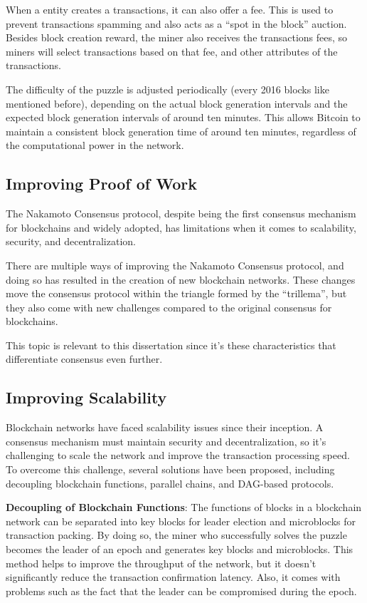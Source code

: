When a entity creates a transactions, it can also offer a fee. This is used to prevent transactions spamming and also acts as a ``spot in the block'' auction.
Besides block creation reward, the miner also receives the transactions fees, so miners will select transactions based on that fee, and other attributes of the transactions.

The difficulty of the puzzle is adjusted periodically (every 2016 blocks like mentioned before), depending on the actual block generation intervals and the expected block generation intervals of around ten minutes. This allows Bitcoin to maintain a consistent block generation time of around ten minutes, regardless of the computational power in the network.

\subsection*{Improving Proof of Work}

The Nakamoto Consensus protocol, despite being the first consensus mechanism for blockchains and widely adopted, has limitations when it comes to scalability, security, and decentralization.

There are multiple ways of improving the Nakamoto Consensus protocol, and doing so has resulted in the creation of new blockchain networks. These changes move the consensus protocol within the triangle formed by the ``trillema'', but they also come with new challenges compared to the original consensus for blockchains.

This topic is relevant to this dissertation since it's these characteristics that differentiate consensus even further.

\subsection*{Improving Scalability}
Blockchain networks have faced scalability issues since their inception. A consensus mechanism must maintain security and decentralization, so it's challenging to scale the network and improve the transaction processing speed. To overcome this challenge, several solutions have been proposed, including decoupling blockchain functions, parallel chains, and DAG-based protocols.

\textbf{Decoupling of Blockchain Functions}: The functions of blocks in a blockchain network can be separated into key blocks for leader election and microblocks for transaction packing. By doing so, the miner who successfully solves the puzzle becomes the leader of an epoch and generates key blocks and microblocks. This method helps to improve the throughput of the network, but it doesn't significantly reduce the transaction confirmation latency. Also, it comes with problems such as the fact that the leader can be compromised during the epoch.


